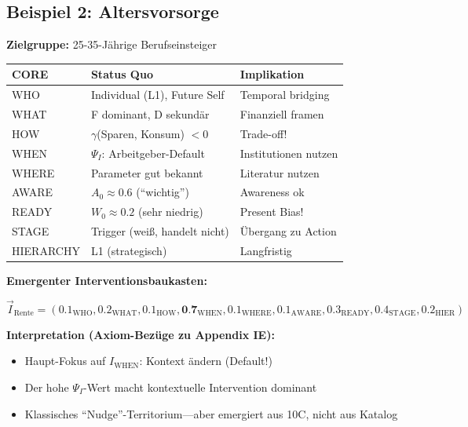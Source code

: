 \subsection{Beispiel 2: Altersvorsorge}
\label{sec:17-example-retirement}

\begin{tcolorbox}[colback=green!5!white, colframe=green!75!black,
    title=\textbf{10C Status Quo: Altersvorsorge}]

\textbf{Zielgruppe:} 25-35-J\"{a}hrige Berufseinsteiger

\begin{center}
\renewcommand{\arraystretch}{1.2}
\small
\begin{tabular}{@{}lll@{}}
\toprule
\textbf{CORE} & \textbf{Status Quo} & \textbf{Implikation} \\
\midrule
WHO & Individual (L1), Future Self & Temporal bridging \\
WHAT & F dominant, D sekund\"{a}r & Finanziell framen \\
HOW & $\gamma$(Sparen, Konsum) $< 0$ & Trade-off! \\
WHEN & $\Psi_I$: Arbeitgeber-Default & Institutionen nutzen \\
WHERE & Parameter gut bekannt & Literatur nutzen \\
AWARE & $A_0 \approx 0.6$ (``wichtig'') & Awareness ok \\
READY & $W_0 \approx 0.2$ (sehr niedrig) & Present Bias! \\
STAGE & Trigger (wei\ss{}, handelt nicht) & \"{U}bergang zu Action \\
HIERARCHY & L1 (strategisch) & Langfristig \\
\bottomrule
\end{tabular}
\end{center}

\end{tcolorbox}

\textbf{Emergenter Interventionsbaukasten:}

\begin{equation}
\vec{I}_{\text{Rente}} = (0.1_{\text{WHO}}, 0.2_{\text{WHAT}}, 0.1_{\text{HOW}}, \textbf{0.7}_{\text{WHEN}}, 0.1_{\text{WHERE}}, 0.1_{\text{AWARE}}, 0.3_{\text{READY}}, 0.4_{\text{STAGE}}, 0.2_{\text{HIER}})
\end{equation}

\textbf{Interpretation (Axiom-Bezüge zu Appendix IE):}
\begin{itemize}[nosep]
\item Haupt-Fokus auf $I_{\text{WHEN}}$: Kontext \"{a}ndern (Default!)
\item Der hohe $\Psi_I$-Wert macht kontextuelle Intervention dominant
\item Klassisches ``Nudge''-Territorium---aber emergiert aus 10C, nicht aus Katalog
\end{itemize}

